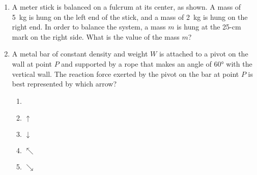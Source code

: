 \documentclass{../../../oss-apphys}
\begin{document}
\begin{multicols}{2}
\begin{enumerate}[leftmargin=18pt]
  \item A meter stick is balanced on a fulcrum at its center, as shown. A mass
    of \SI{5}{\kilo\gram} is hung on the left end of the stick, and a mass of
    \SI{2}{\kilo\gram} is hung on the right end. In order to balance the
    system, a mass $m$ is hung at the 25-cm mark on the right
    side. What is the value of the mass $m$?
    \begin{center}
    \end{center}


  \item A metal bar of constant density and weight $W$ is attached to a pivot on
    the wall at point $P$ and supported by a rope that makes an angle of
    \ang{60} with the vertical wall. The reaction force exerted by the pivot on
    the bar at point $P$ is best represented by which arrow?
    \begin{enumerate}[topsep=0pt,itemsep=3pt,leftmargin=18pt,label=(\Alph*)]
    \item\vspace{-.15in}{\LARGE $\nearrow$}
    \item{\LARGE $\uparrow$}
    \item{\LARGE $\downarrow$}
    \item{\LARGE $\nwarrow$}
    \item{\LARGE $\searrow$}
    \end{enumerate}
    \columnbreak
    

\end{enumerate}
\end{multicols}
\end{document}
